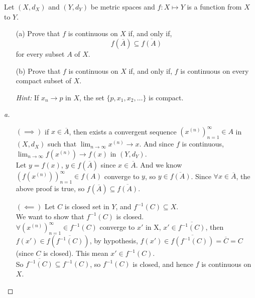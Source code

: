 
\begin{problem}[20pts]
  Let $(X,d_X)$ and $(Y,d_Y)$ be metric spaces and $f:X \mapsto Y$ is a function from $X$ to $Y$.
\begin{enumerate}

  \item[(a)] 
  Prove that $f$ is continuous on $X$ if, and only if,
\[
f(\overline{A}) \subseteq \overline{f(A)}
\]
for every subset $A$ of $X$.

  \item[(b)]  Prove that $f$ is continuous on $X$ if, and only if, $f$ is continuous on every compact subset of $X$.  

\textit{Hint:} If $x_n \to p$ in $X$, the set $\{p, x_1, x_2, \dots \}$ is compact.

 \end{enumerate}
\end{problem}

\begin{proof}[a]

\vphantom{text}
\begin{itemize}
    \item [\((\implies )\)] if $x \in \overline{A}$, then exists a convergent sequence $(x^{(n)})_{n=1}^\infty \in A$ in $(X, d_X)$ such that $\lim_{n \to \infty} x^{(n)} \to x$. And since $f$ is continuous, $\lim_{n \to \infty} f(x^{(n)}) \to f(x)$ in $(Y, d_Y)$. \\
    Let $y = f(x)$, $y \in f(\overline{A})$ since $x \in \overline{A}$. And we know $(f(x^{(n)}))_{n=1}^\infty \in f(A)$ converge to $y$, so $y \in \overline{f(A)}$.
    Since $\forall x\in \overline{A}$, the above proof is true, so $f(\overline{A}) \subseteq \overline{f(A)}$.
    \item [\((\impliedby )\)] Let $C$ is closed set in $Y$, and $f^{-1}(C) \subseteq X$. \\
    We want to show that $f^{-1}(C)$ is closed. \\
    $\forall (x^{(n)})_{n=1}^{\infty} \in f^{-1}(C)$ converge to $x'$ in X, $x' \in \overline{f^{-1}(C)}$, then $f(x') \in f(\overline{f^{-1}(C)})$, by hypothesis, $f(x') \in \overline{f(f^{-1}(C))} = \overline{C} = C$ (since $C$ is closed). This mean $x' \in f^{-1}(C)$. \\
    So $\overline{f^{-1}(C)} \subseteq f^{-1}(C)$, so $f^{-1}(C)$ is closed, and hence $f$ is continuous on $X$.
\end{itemize}
\end{proof}


